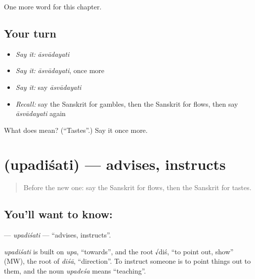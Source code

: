 \begin{grammarlens}[title={What you've built}]
One more word for this chapter.
\end{grammarlens}

\subsection*{Your turn}
\begin{itemize}
\raggedright
  \item \emph{Say it:} \emph{āsvādayati}
  \item \emph{Say it:} \emph{āsvādayati}, once more
  \item \emph{Say it:} say \emph{āsvādayati}
  \item \emph{Recall:} say the Sanskrit for gambles, then the Sanskrit for flows, then say \emph{āsvādayati} again
\end{itemize}

\begin{tcolorbox}[breakable,colback=teal!4,colframe=teal!35!black,title={Before you move on}]
What does  mean? (\textquotedblleft{}Tastes\textquotedblright{}.) Say it once more.
\end{tcolorbox}
\section[\texorpdfstring{\sk{उपदिशति} (upadiśati)}{उपदिशति (upadiśati)}]{ (upadiśati) — advises, instructs}

\label{lesson:SA-C207-upadisati}



\begin{quote}
Before the new one: say the Sanskrit for flows, then the Sanskrit for tastes.
\end{quote}

\subsection*{You'll want to know: }
\textbf{} — \emph{upadiśati} — \textquotedblleft{}advises, instructs\textquotedblright{}.

\begin{cousinweb}
\emph{upadiśati} is built on \emph{upa}, \textquotedblleft{}towards\textquotedblright{}, and the root √diś, \textquotedblleft{}to point out, show\textquotedblright{} (MW), the root of \emph{diśā}, \textquotedblleft{}direction\textquotedblright{}. To instruct someone is to point things out to them, and the noun \emph{upadeśa} means \textquotedblleft{}teaching\textquotedblright{}.
\end{cousinweb}

